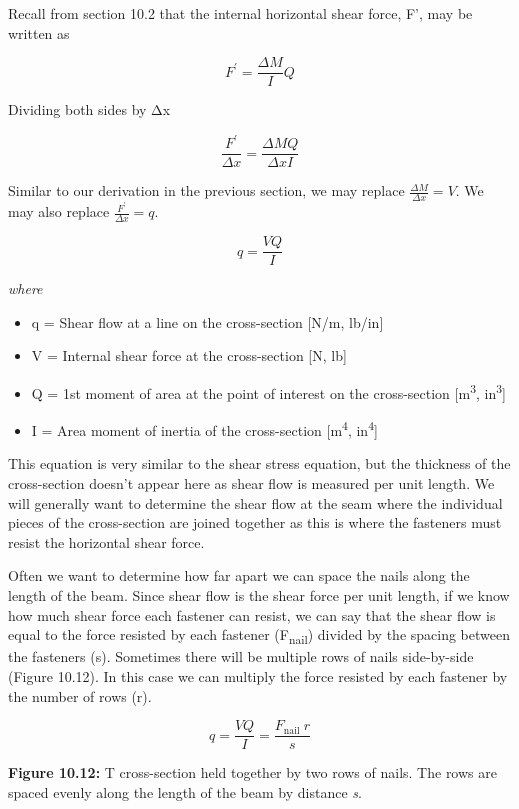 \documentclass[
  letterpaper,
  DIV=11,
  numbers=noendperiod]{scrreprt}
\begin{document}
Recall from section 10.2 that the internal horizontal shear force, F',
may be written as

\[
F^{\prime}=\frac{\Delta M}{I} Q
\]

Dividing both sides by Δx

\[
\frac{F^{\prime}}{\Delta x}=\frac{\Delta M Q}{\Delta x I}
\]

Similar to our derivation in the previous section, we may replace
\(\frac{\Delta M}{\Delta x}=V\). We may also replace
\(\frac{F^{\prime}}{\Delta x}=q\).

\[
q=\frac{V Q}{I}
\]

\emph{where}

\begin{itemize}
\item
  q = Shear flow at a line on the cross-section {[}N/m, lb/in{]}
\item
  V = Internal shear force at the cross-section {[}N, lb{]}
\item
  Q = 1st moment of area at the point of interest on the cross-section
  {[}m\textsuperscript{3}, in\textsuperscript{3}{]}
\item
  I = Area moment of inertia of the cross-section
  {[}m\textsuperscript{4}, in\textsuperscript{4}{]}
\end{itemize}

This equation is very similar to the shear stress equation, but the
thickness of the cross-section doesn't appear here as shear flow is
measured per unit length. We will generally want to determine the shear
flow at the seam where the individual pieces of the cross-section are
joined together as this is where the fasteners must resist the
horizontal shear force.

Often we want to determine how far apart we can space the nails along
the length of the beam. Since shear flow is the shear force per unit
length, if we know how much shear force each fastener can resist, we can
say that the shear flow is equal to the force resisted by each fastener
(F\textsubscript{nail}) divided by the spacing between the fasteners
(s). Sometimes there will be multiple rows of nails side-by-side (Figure
10.12). In this case we can multiply the force resisted by each fastener
by the number of rows (r).

\[
q=\frac{V Q}{I}=\frac{F_{\text {nail }} r}{s}
\]

\textbf{Figure 10.12:} T cross-section held together by two rows of
nails. The rows are spaced evenly along the length of the beam by
distance \emph{s}.
\end{document}
